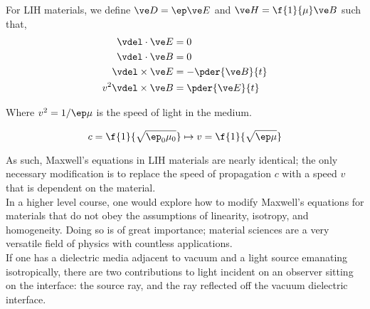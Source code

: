 \documentclass{article}
\begin{document}
For LIH materials, we define $\ve D = \ep \ve E$ and $\ve H = \f{1}{\mu} \ve B$ such that,
\begin{align*}
    \vdel \cdot \ve E &= 0 \\
    \vdel \cdot \ve B &= 0 \\
    \vdel \times \ve E &= - \pder{\ve B}{t} \\
    v^2 \vdel \times \ve B &= \pder{\ve E}{t}
\end{align*}

Where $v^2 = 1 / \ep \mu$ is the speed of light in the medium.

\[ c = \f{1}{\sqrt{\ep_0 \mu_0}} \mapsto v = \f{1}{\sqrt{\ep \mu}} \]

As such, Maxwell's equations in LIH materials are nearly identical; the only necessary modification is to replace the speed of propagation $c$ with a speed $v$ that is dependent on the material. \\

In a higher level course, one would explore how to modify Maxwell's equations for materials that do not obey the assumptions of linearity, isotropy, and homogeneity. Doing so is of great importance; material sciences are a very versatile field of physics with countless applications. \\

If one has a dielectric media adjacent to vacuum and a light source emanating isotropically, there are two contributions to light incident on an observer sitting on the interface: the source ray, and the ray reflected off the vacuum dielectric interface.

\begin{center}
\end{center}
\end{document}
